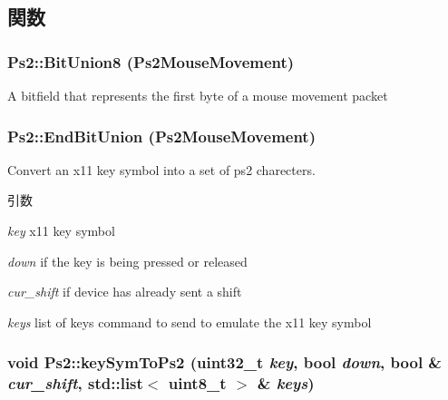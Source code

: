 \subsection{関数}
\hypertarget{namespacePs2_a188d558479ae253a9f17963c50406f58}{
\subsubsection[{BitUnion8}]{\setlength{\rightskip}{0pt plus 5cm}Ps2::BitUnion8 (Ps2MouseMovement)}}
\label{namespacePs2_a188d558479ae253a9f17963c50406f58}
A bitfield that represents the first byte of a mouse movement packet \hypertarget{namespacePs2_a35af99e63a47d5c34de1ade7d969b743}{
\subsubsection[{EndBitUnion}]{\setlength{\rightskip}{0pt plus 5cm}Ps2::EndBitUnion (Ps2MouseMovement)}}
\label{namespacePs2_a35af99e63a47d5c34de1ade7d969b743}
Convert an x11 key symbol into a set of ps2 charecters. 
\begin{DoxyParams}{引数}
\item[{\em key}]x11 key symbol \item[{\em down}]if the key is being pressed or released \item[{\em cur\_\-shift}]if device has already sent a shift \item[{\em keys}]list of keys command to send to emulate the x11 key symbol \end{DoxyParams}
\hypertarget{namespacePs2_a5599df131a06c99284c4ceb9c1b83fd6}{
\subsubsection[{keySymToPs2}]{\setlength{\rightskip}{0pt plus 5cm}void Ps2::keySymToPs2 ({\bf uint32\_\-t} {\em key}, \/  bool {\em down}, \/  bool \& {\em cur\_\-shift}, \/  {\bf std::list}$<$ uint8\_\-t $>$ \& {\em keys})}}
\label{namespacePs2_a5599df131a06c99284c4ceb9c1b83fd6}



